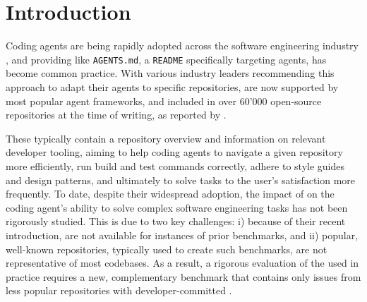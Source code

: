\vspace{-2mm}
\section{Introduction}
\label{sec:introduction}

Coding agents are being rapidly adopted across the software engineering industry \citep{cursor}, and providing \agentsmds{} like \texttt{AGENTS.md}, a \texttt{README} specifically targeting agents, has become common practice. With various industry leaders \citep{AGENTSMd2025,UsingClaudeMdFiles} recommending this approach to adapt their agents to specific repositories, \agentsmds{} are now supported by most popular agent frameworks, and included in over 60'000 open-source repositories at the time of writing, as reported by \citet{AGENTSMd2025}. 

These \agentsmds{} typically contain a repository overview and information on relevant developer tooling, aiming to help coding agents to navigate a given repository more efficiently, run build and test commands correctly, adhere to style guides and design patterns, and ultimately to solve tasks to the user's satisfaction more frequently.
To date, despite their widespread adoption, the impact of \agentsmds{} on the coding agent's ability to solve complex software engineering tasks has not been rigorously studied.
This is due to two key challenges: i) because of their recent introduction, \agentsmds{} are not available for instances of prior benchmarks, and ii) popular, well-known repositories, typically used to create such benchmarks, are not representative of most codebases. As a result, a rigorous evaluation of the \agentsmds{} used in practice requires a new, complementary benchmark that contains only issues from less popular repositories with developer-committed \agentsmds{}.



